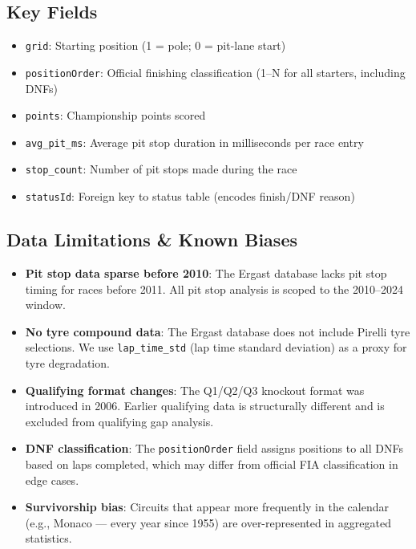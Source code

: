 \documentclass[12pt, a4paper]{article}
\begin{document}
\subsection{Key Fields}
\begin{itemize}[noitemsep]
    \item \texttt{grid}: Starting position (1 = pole; 0 = pit-lane start)
    \item \texttt{positionOrder}: Official finishing classification (1--N for all starters, including DNFs)
    \item \texttt{points}: Championship points scored
    \item \texttt{avg\_pit\_ms}: Average pit stop duration in milliseconds per race entry
    \item \texttt{stop\_count}: Number of pit stops made during the race
    \item \texttt{statusId}: Foreign key to status table (encodes finish/DNF reason)
\end{itemize}

\subsection{Data Limitations \& Known Biases}
\begin{itemize}[noitemsep]
    \item \textbf{Pit stop data sparse before 2010}: The Ergast database lacks pit stop timing for races before 2011. All pit stop analysis is scoped to the 2010--2024 window.
    \item \textbf{No tyre compound data}: The Ergast database does not include Pirelli tyre selections. We use \texttt{lap\_time\_std} (lap time standard deviation) as a proxy for tyre degradation.
    \item \textbf{Qualifying format changes}: The Q1/Q2/Q3 knockout format was introduced in 2006. Earlier qualifying data is structurally different and is excluded from qualifying gap analysis.
    \item \textbf{DNF classification}: The \texttt{positionOrder} field assigns positions to all DNFs based on laps completed, which may differ from official FIA classification in edge cases.
    \item \textbf{Survivorship bias}: Circuits that appear more frequently in the calendar (e.g., Monaco --- every year since 1955) are over-represented in aggregated statistics.
\end{itemize}

\newpage
\end{document}

